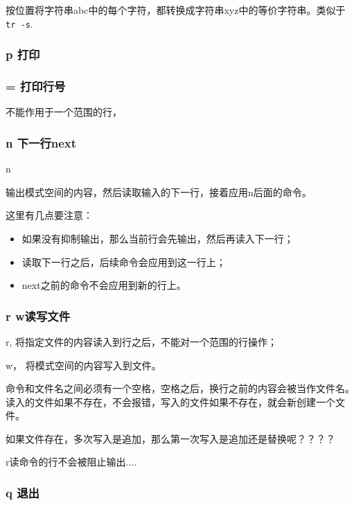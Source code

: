 按位置将字符串abc中的每个字符，都转换成字符串xyz中的等价字符串。类似于\lstinline$tr -s$.

\subsubsection{p 打印}

\subsubsection{= 打印行号}

不能作用于一个范围的行，

\subsubsection{n 下一行next}

\begin{Command-Line}
[address]n
\end{Command-Line}

输出模式空间的内容，然后读取输入的下一行，接着应用n后面的命令。

这里有几点要注意：
\begin{itemize}
\item 如果没有抑制输出，那么当前行会先输出，然后再读入下一行；
\item 读取下一行之后，后续命令会应用到这一行上；
\item next之前的命令不会应用到新的行上。
\end{itemize}

\subsubsection{r w读写文件}

r, 将指定文件的内容读入到行之后，不能对一个范围的行操作；

w， 将模式空间的内容写入到文件。


命令和文件名之间必须有一个空格，空格之后，换行之前的内容会被当作文件名。读入的文件如果不存在，不会报错，写入的文件如果不存在，就会新创建一个文件。

如果文件存在，多次写入是追加，那么第一次写入是追加还是替换呢？？？？


r读命令的行不会被阻止输出....



\subsubsection{q 退出}

